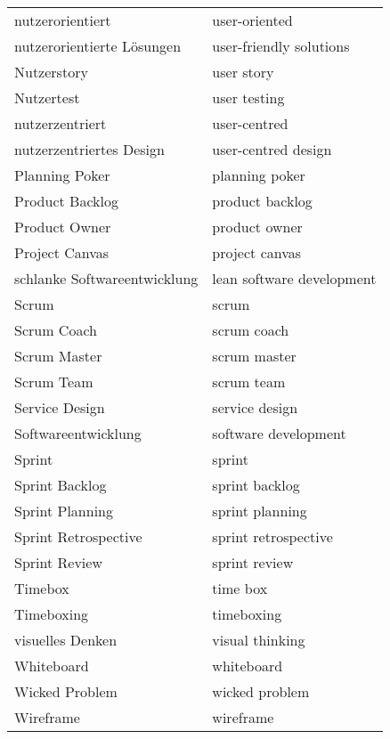 \begin{spacing}{.5}
\begin{longtable}{ p{} p{}}
    nutzerorientiert & user-oriented \\
    nutzerorientierte Lösungen & user-friendly solutions \\
    Nutzerstory & user story \\
    Nutzertest & user testing \\
    nutzerzentriert & user-centred \\
    nutzerzentriertes Design & user-centred design \\
    Planning Poker & planning poker \\
    Product Backlog & product backlog \\
    Product Owner & product owner \\
    Project Canvas & project canvas \\
    schlanke Softwareentwicklung & lean software development \\
    Scrum & scrum \\
    Scrum Coach & scrum coach \\
    Scrum Master & scrum master \\
    Scrum Team & scrum team \\
    Service Design & service design \\
    Softwareentwicklung & software development \\
    Sprint & sprint \\
    Sprint Backlog & sprint backlog \\
    Sprint Planning & sprint planning \\
    Sprint Retrospective & sprint retrospective \\
    Sprint Review & sprint review \\
    Timebox & time box \\
    Timeboxing & timeboxing \\
    visuelles Denken & visual thinking \\
    Whiteboard & whiteboard \\
    Wicked Problem & wicked problem \\
    Wireframe & wireframe \\
\end{longtable}
\end{spacing}
\endgroup


\newpage

